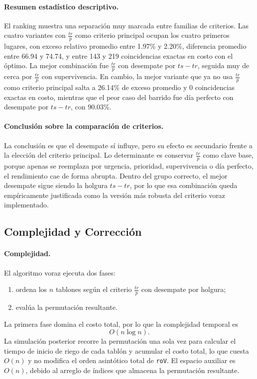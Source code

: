 \documentclass[12pt,a4paper]{article}
\begin{document}
\paragraph{Resumen estad\'istico descriptivo.}
El ranking muestra una separaci\'on muy marcada entre familias de criterios. Las cuatro variantes con \(\frac{tr}{p}\) como criterio principal ocupan los cuatro primeros lugares, con exceso relativo promedio entre 1.97\% y 2.20\%, diferencia promedio entre 66.94 y 74.74, y entre 143 y 219 coincidencias exactas en costo con el \'optimo. La mejor combinaci\'on fue \(\frac{tr}{p}\) con desempate por \(ts-tr\), seguida muy de cerca por \(\frac{tr}{p}\) con supervivencia. En cambio, la mejor variante que ya no usa \(\frac{tr}{p}\) como criterio principal salta a 26.14\% de exceso promedio y 0 coincidencias exactas en costo, mientras que el peor caso del barrido fue d\'ia perfecto con desempate por \(ts-tr\), con 90.03\%.

\paragraph{Conclusi\'on sobre la comparaci\'on de criterios.}
La conclusi\'on es que el desempate s\'i influye, pero su efecto es secundario frente a la elecci\'on del criterio principal. Lo determinante es conservar \(\frac{tr}{p}\) como clave base, porque apenas se reemplaza por urgencia, prioridad, supervivencia o d\'ia perfecto, el rendimiento cae de forma abrupta. Dentro del grupo correcto, el mejor desempate sigue siendo la holgura \(ts-tr\), por lo que esa combinaci\'on queda emp\'iricamente justificada como la versi\'on m\'as robusta del criterio voraz implementado.

\subsection{Complejidad y Correcci\'on}

\paragraph{Complejidad.}
El algoritmo voraz ejecuta dos fases:
\begin{enumerate}
  \item ordena los \(n\) tablones seg\'un el criterio \(\frac{tr}{p}\) con desempate por holgura;
  \item eval\'ua la permutaci\'on resultante.
\end{enumerate}
La primera fase domina el costo total, por lo que la complejidad temporal es
\[
O(n \log n).
\]
La simulaci\'on posterior recorre la permutaci\'on una sola vez para calcular el 
tiempo de inicio de riego de cada tabl\'on y acumular el costo total, lo que 
cuesta $O(n)$ y no modifica el orden asint\'otico total de \texttt{roV}. El 
espacio auxiliar es $O(n)$, debido al arreglo de \'indices que almacena la 
permutaci\'on resultante.
\end{document}

